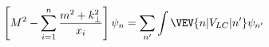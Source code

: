 \begin{equation}
\left[M^2 - \sum_{i=1}^n{m^2 + k^2_\perp\over x_i}\right] \psi_n =
\sum_{n'}\int \VEV{n|V_{LC}|n'} \psi_{n'}\end{equation}

